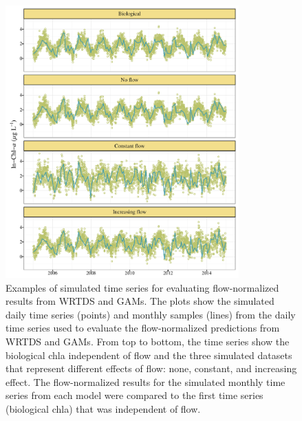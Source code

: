\documentclass{svjour3}\usepackage[]{graphicx}\usepackage[]{color}
\begin{document}
\begin{figure}
\centering
\includegraphics[width=0.8\textwidth]{figs/simex.pdf}
\caption{Examples of simulated time series for evaluating flow-normalized results from \ac{WRTDS} and \acp{GAM}.  The plots show the simulated daily time series (points) and monthly samples (lines) from the daily time series used to evaluate the flow-normalized predictions from \ac{WRTDS} and \acp{GAM}.  From top to bottom, the time series show the biological \ac{chla} independent of flow and the three simulated datasets that represent different effects of flow: none, constant, and increasing effect.  The flow-normalized results for the simulated monthly time series from each model were compared to the first time series (biological \ac{chla}) that was independent of flow.}
\label{fig:simex}
\end{figure}
\clearpage
\end{document}
